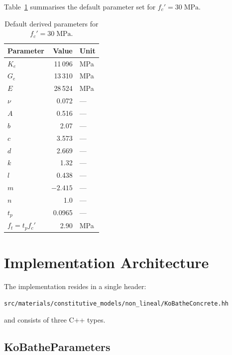 Table~\ref{tab:kb-params} summarises the default parameter set for
$f_c' = 30\;\text{MPa}$.

\begin{table}[htb]
\centering
\caption{Default derived parameters for $f_c' = 30\;\text{MPa}$.}
\label{tab:kb-params}
\begin{tabular}{@{}lrl@{}}
\toprule
\textbf{Parameter} & \textbf{Value} & \textbf{Unit} \\
\midrule
$K_e$          & 11\,096  & MPa \\
$G_e$          & 13\,310  & MPa \\
$E$            & 28\,524  & MPa \\
$\nu$          & 0.072    & --- \\[\jot]
$A$            & 0.516    & --- \\
$b$            & 2.07     & --- \\
$c$            & 3.573    & --- \\
$d$            & 2.669    & --- \\[\jot]
$k$            & 1.32     & --- \\
$l$            & 0.438    & --- \\
$m$            & $-2.415$ & --- \\
$n$            & 1.0      & --- \\[\jot]
$t_p$          & 0.0965   & --- \\
$f_t = t_p f_c'$ & 2.90  & MPa \\
\bottomrule
\end{tabular}
\end{table}

\section{Implementation Architecture}
\label{sec:kb-architecture}

The implementation resides in a single header:
\begin{center}
\texttt{src/materials/constitutive\_models/non\_lineal/KoBatheConcrete.hh}
\end{center}
and consists of three C++ types.

\subsection{KoBatheParameters}
\label{ssec:kb-params-class}

